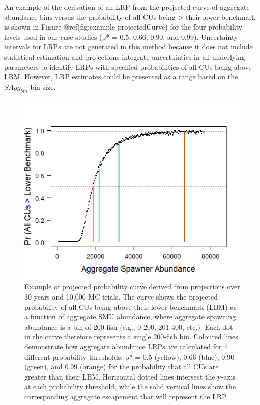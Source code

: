 \documentclass[
]{article}
\begin{document}
An example of the derivation of an LRP from the projected curve of
aggregate abundance bins versus the probability of all CUs being
\textgreater{} their lower benchmark is shown in Figure
@ref(fig:example-projectedCurve) for the four probability levels used in
our case studies (p* = 0.5, 0.66, 0.90, and 0.99). Uncertainty intervals
for LRPs are not generated in this method because it does not include
statistical estimation and projections integrate uncertainties in all
underlying parameters to identify LRPs with specified probabilities of
all CUs being above LBM. However, LRP estimates could be presented as a
range based on the \(SAgg_{bin}\) bin size.

\begin{figure}

{\centering \includegraphics[width=0.6\linewidth]{figure/methods-Example-ProjectedLRP} 

}

\caption{Example of projected probability curve derived from projections over 30 years and 10,000 MC trials.  The curve shows the projected probability of all CUs being above their lower benchmark (LBM) as a function of aggregate SMU abundance, where aggregate spawning abundance is a bin of 200 fish (e.g., 0-200, 201-400, etc.). Each dot in the curve therefore represents a single 200-fish bin. Coloured lines demonstrate how aggregate abundance LRPs are calculated for 4 different probability thresholds: p* = 0.5 (yellow), 0.66 (blue), 0.90 (green), and 0.99 (orange) for the probability that all CUs are greater than their LBM. Horizontal dotted lines intersect the y-axis at each probability threshold, while the solid vertical lines show the corresponding aggregate escapement that will represent the LRP.}\label{fig:example-projectedCurve}
\end{figure}
\end{document}
